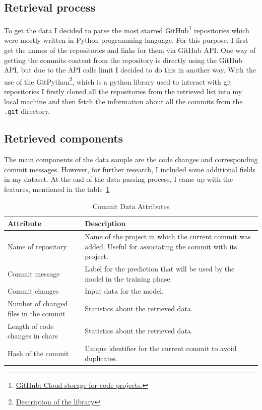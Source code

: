 \subsection{Retrieval process}
 To get the data I decided to parse the most starred GitHub\footnote[1]{\href{https://github.com}{GitHub: Cloud storage for code projects.}} repositories which were mostly written in Python programming language. For this purpose, I first get the names of the repositories and links for them via GitHub API\@. One way of getting the commits content from the repository is directly using the GitHub API, but due to the API calls limit I decided to do this in another way. With the use of the GitPython\footnote[2]{\href{https://pypi.org/project/GitPython/}{Description of the library}}, which is a python library used to interact with git repositories I firstly cloned all the repositories from the retrieved list into my local machine and then fetch the information about all the commits from the \texttt{.git} directory. 

 \subsection{Retrieved components}
 The main components of the data sample are the code changes and corresponding commit messages. However, for further research, I included some additional fields in my dataset. At the end of the data parsing process, I came up with the features, mentioned in the table~{}\ref{table:commit_data_attributes}

{ 
    \renewcommand{\arraystretch}{2} %
    \begin{table}[h]
    \caption{Commit Data Attributes}\label{table:commit_data_attributes}
    \centering
    \begin{tabularx}{\textwidth}{|l|X|} %
    \hline %
    \textbf{Attribute} & \textbf{Description} \\
    \hline %
    Name of repository & Name of the project in which the current commit was added. Useful for associating the commit with its project. \\
    \hline %
    Commit message & Label for the prediction that will be used by the model in the training phase. \\
    \hline %
    Commit changes & Input data for the model. \\
    \hline %
    Number of changed files in the commit & Statistics about the retrieved data. \\
    \hline %
    Length of code changes in chars & Statistics about the retrieved data. \\
    \hline %
    Hash of the commit & Unique identifier for the current commit to avoid duplicates. \\
    \hline %
    \end{tabularx}
\end{table}
}
    
